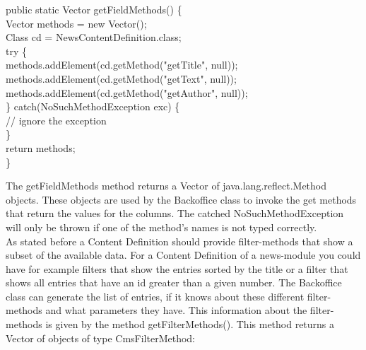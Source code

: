 \begin{java}
\jtaba public static Vector getFieldMethods() \{\\
\jtabb        Vector methods = new Vector();\\
\jtabb        Class cd = NewsContentDefinition.class;\\
\jtabb        try \{\\
\jtabc                methods.addElement(cd.getMethod("getTitle", null));\\
\jtabc                methods.addElement(cd.getMethod("getText", null));\\
\jtabc                methods.addElement(cd.getMethod("getAuthor", null));\\
\jtabb        \} catch(NoSuchMethodException exc) \{\\
\jtabc                // ignore the exception\\
\jtabb        \}\\
\jtabb        return methods;\\
\jtaba \}\\
\end{java}

The {\meth getFieldMethods} method returns a Vector of {\class java.lang.reflect.Method} objects.
These objects are used by the Backoffice class to invoke the get methods that return
the values for the columns. The catched {\class NoSuchMethodException} will only 
be thrown if one of the method's names is not typed correctly.\\

As stated before a Content Definition should provide filter-methods that show a 
subset of the available data. For a Content Definition of a news-module you could have for example 
filters that show the entries sorted by the title or a filter that shows
all entries that have an id greater than a given number. The Backoffice class can
generate the list of entries, if it knows about these different filter-methods and
what parameters they have. This information about the filter-methods is given by the
method {\meth getFilterMethods()}. This method returns a Vector of objects of type 
{\class CmsFilterMethod}:\\

